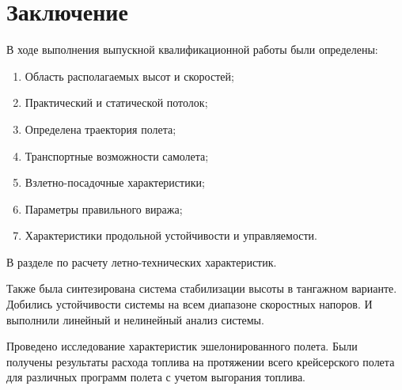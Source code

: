 \chapter*{\centering Заключение} 

В ходе выполнения выпускной квалификационной работы были определены:
\begin{enumerate}
    \item Область располагаемых высот и скоростей;
    \item Практический и статической потолок;
    \item Определена траектория полета;
    \item Транспортные возможности самолета; 
    \item Взлетно-посадочные характеристики;
    \item Параметры правильного виража; 
    \item Характеристики продольной устойчивости и управляемости.
\end{enumerate}
В разделе по расчету летно-технических характеристик.

Также была синтезирована система стабилизации высоты в тангажном варианте. 
Добились устойчивости системы на всем диапазоне скоростных напоров. И выполнили
линейный и нелинейный анализ системы.

Проведено исследование характеристик эшелонированного полета. Были получены
результаты расхода топлива на протяжении всего крейсерского полета для
различных программ полета с учетом выгорания топлива.

